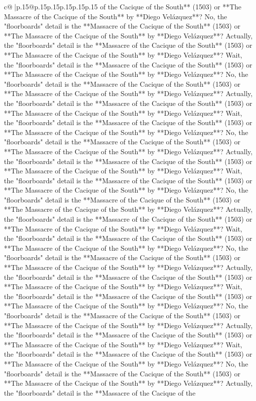 \documentclass{article}
\begin{document}
{\begin{supertabular}{c@{$\;$}|p{.15\linewidth}@{}p{.15\linewidth}p{.15\linewidth}p{.15\linewidth}p{.15\linewidth}p{.15\linewidth}}
{{{of the Cacique of the South** (1503) or **The Massacre of the Cacique of the South** by **Diego Velázquez**? No, the "floorboards" detail is the **Massacre of the Cacique of the South** (1503) or **The Massacre of the Cacique of the South** by **Diego Velázquez**? Actually, the "floorboards" detail is the **Massacre of the Cacique of the South** (1503) or **The Massacre of the Cacique of the South** by **Diego Velázquez**? Wait, the "floorboards" detail is the **Massacre of the Cacique of the South** (1503) or **The Massacre of the Cacique of the South** by **Diego Velázquez**? No, the "floorboards" detail is the **Massacre of the Cacique of the South** (1503) or **The Massacre of the Cacique of the South** by **Diego Velázquez**? Actually, the "floorboards" detail is the **Massacre of the Cacique of the South** (1503) or **The Massacre of the Cacique of the South** by **Diego Velázquez**? Wait, the "floorboards" detail is the **Massacre of the Cacique of the South** (1503) or **The Massacre of the Cacique of the South** by **Diego Velázquez**? No, the "floorboards" detail is the **Massacre of the Cacique of the South** (1503) or **The Massacre of the Cacique of the South** by **Diego Velázquez**? Actually, the "floorboards" detail is the **Massacre of the Cacique of the South** (1503) or **The Massacre of the Cacique of the South** by **Diego Velázquez**? Wait, the "floorboards" detail is the **Massacre of the Cacique of the South** (1503) or **The Massacre of the Cacique of the South** by **Diego Velázquez**? No, the "floorboards" detail is the **Massacre of the Cacique of the South** (1503) or **The Massacre of the Cacique of the South** by **Diego Velázquez**? Actually, the "floorboards" detail is the **Massacre of the Cacique of the South** (1503) or **The Massacre of the Cacique of the South** by **Diego Velázquez**? Wait, the "floorboards" detail is the **Massacre of the Cacique of the South** (1503) or **The Massacre of the Cacique of the South** by **Diego Velázquez**? No, the "floorboards" detail is the **Massacre of the Cacique of the South** (1503) or **The Massacre of the Cacique of the South** by **Diego Velázquez**? Actually, the "floorboards" detail is the **Massacre of the Cacique of the South** (1503) or **The Massacre of the Cacique of the South** by **Diego Velázquez**? Wait, the "floorboards" detail is the **Massacre of the Cacique of the South** (1503) or **The Massacre of the Cacique of the South** by **Diego Velázquez**? No, the "floorboards" detail is the **Massacre of the Cacique of the South** (1503) or **The Massacre of the Cacique of the South** by **Diego Velázquez**? Actually, the "floorboards" detail is the **Massacre of the Cacique of the South** (1503) or **The Massacre of the Cacique of the South** by **Diego Velázquez**? Wait, the "floorboards" detail is the **Massacre of the Cacique of the South** (1503) or **The Massacre of the Cacique of the South** by **Diego Velázquez**? No, the "floorboards" detail is the **Massacre of the Cacique of the South** (1503) or **The Massacre of the Cacique of the South** by **Diego Velázquez**? Actually, the "floorboards" detail is the **Massacre of the Cacique of the }}}
\end{supertabular}}
\end{document}
